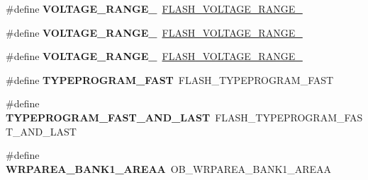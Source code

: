 \begin{DoxyCompactItemize}
\#define {\bfseries V\+O\+L\+T\+A\+G\+E\+\_\+\+R\+A\+N\+G\+E\+\_}~\mbox{\hyperlink{group___f_l_a_s_h_ex___voltage___range_gad047be2bc7aa9be946b5b0c6b3062ef3}{F\+L\+A\+S\+H\+\_\+\+V\+O\+L\+T\+A\+G\+E\+\_\+\+R\+A\+N\+G\+E\+\_}}
\item 
\mbox{\label{group___h_a_l___f_l_a_s_h___aliased___defines_ga45c6cc06a75f9dfd18e3d182cbe1387b}} 
\#define {\bfseries V\+O\+L\+T\+A\+G\+E\+\_\+\+R\+A\+N\+G\+E\+\_}~\mbox{\hyperlink{group___f_l_a_s_h_ex___voltage___range_ga50950407a789684eec9216f49e0831a0}{F\+L\+A\+S\+H\+\_\+\+V\+O\+L\+T\+A\+G\+E\+\_\+\+R\+A\+N\+G\+E\+\_}}
\item 
\mbox{\label{group___h_a_l___f_l_a_s_h___aliased___defines_ga98497e19f090f03d71a1537fbcfebfe9}} 
\#define {\bfseries V\+O\+L\+T\+A\+G\+E\+\_\+\+R\+A\+N\+G\+E\+\_}~\mbox{\hyperlink{group___f_l_a_s_h_ex___voltage___range_gabf8037a482f18815c5a67f287223a658}{F\+L\+A\+S\+H\+\_\+\+V\+O\+L\+T\+A\+G\+E\+\_\+\+R\+A\+N\+G\+E\+\_}}
\item 
\mbox{\label{group___h_a_l___f_l_a_s_h___aliased___defines_gae3b03b62939464528d8a52b034135ea2}} 
\#define {\bfseries T\+Y\+P\+E\+P\+R\+O\+G\+R\+A\+M\+\_\+\+F\+A\+ST}~F\+L\+A\+S\+H\+\_\+\+T\+Y\+P\+E\+P\+R\+O\+G\+R\+A\+M\+\_\+\+F\+A\+ST
\item 
\mbox{\label{group___h_a_l___f_l_a_s_h___aliased___defines_gab52dbb436e471071f4700f9bafcb0cef}} 
\#define {\bfseries T\+Y\+P\+E\+P\+R\+O\+G\+R\+A\+M\+\_\+\+F\+A\+S\+T\+\_\+\+A\+N\+D\+\_\+\+L\+A\+ST}~F\+L\+A\+S\+H\+\_\+\+T\+Y\+P\+E\+P\+R\+O\+G\+R\+A\+M\+\_\+\+F\+A\+S\+T\+\_\+\+A\+N\+D\+\_\+\+L\+A\+ST
\item 
\mbox{\label{group___h_a_l___f_l_a_s_h___aliased___defines_ga4d57e7a32711f223077cc45a55b4d333}} 
\#define {\bfseries W\+R\+P\+A\+R\+E\+A\+\_\+\+B\+A\+N\+K1\+\_\+\+A\+R\+E\+AA}~O\+B\+\_\+\+W\+R\+P\+A\+R\+E\+A\+\_\+\+B\+A\+N\+K1\+\_\+\+A\+R\+E\+AA
\item 
\mbox{\label{group___h_a_l___f_l_a_s_h___aliased___defines_ga073be154a6602831a813316fa4fb17ca}} 

\end{DoxyCompactItemize}
